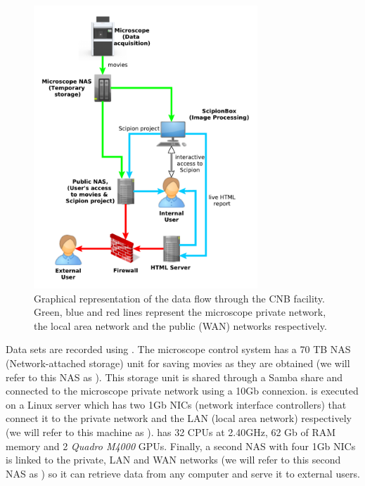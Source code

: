 \begin{figure}
  \centering
      \includegraphics[width=0.75\textwidth]{images/diagram.pdf}
  \caption{Graphical representation of the data flow through the CNB facility. Green, blue and red lines represent the microscope private network, the \cnb local area network and the public (WAN) networks respectively.}
  \label{fig:cnbpipeline}

\end{figure}


Data sets are recorded using \epu. The microscope control system has a 70 TB NAS (Network-attached storage) unit for saving movies as they are obtained (we will refer to this NAS as \mnas). This storage unit is shared through a Samba share and connected to the microscope private network using a 10Gb connexion. \scipion is executed on a Linux server which has two 1Gb NICs (network interface controllers) that connect it to the private network and the LAN (local area network) respectively (we will refer to this machine as \scipionbox). \scipionbox has 32 CPUs at 2.40GHz, 62 Gb of RAM memory and 2 \textit{Quadro M4000} GPUs. Finally, a second NAS with four 1Gb NICs is linked to the private, LAN and WAN networks (we will refer to this second NAS as \onas) so it can retrieve data from any computer and serve it to external users.

